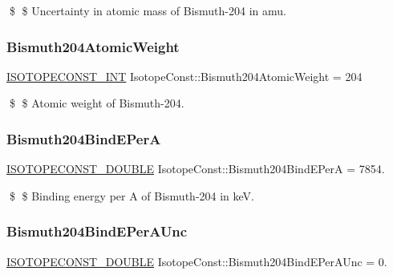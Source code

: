 \$ \$ Uncertainty in atomic mass of Bismuth-\/204 in amu. \mbox{\label{group___isotope_const-_bismuth-_bi204_ga3bc8106ca857e6fe36602bb5661df2bf}} 
\subsubsection{\texorpdfstring{Bismuth204\+Atomic\+Weight}{Bismuth204AtomicWeight}}
{\footnotesize\ttfamily \mbox{\hyperlink{group___isotope_const-_macros_ga5f18360b3e99483a35c32d789e62621c}{I\+S\+O\+T\+O\+P\+E\+C\+O\+N\+S\+T\+\_\+\+I\+NT}} Isotope\+Const\+::\+Bismuth204\+Atomic\+Weight = 204}

\$ \$ Atomic weight of Bismuth-\/204. \mbox{\label{group___isotope_const-_bismuth-_bi204_ga3e73ecb02b6dbdba60faa6b0eb3248a8}} 
\subsubsection{\texorpdfstring{Bismuth204\+Bind\+E\+PerA}{Bismuth204BindEPerA}}
{\footnotesize\ttfamily \mbox{\hyperlink{group___isotope_const-_macros_ga8f45a7272ce02c0b4c65c44636ed719a}{I\+S\+O\+T\+O\+P\+E\+C\+O\+N\+S\+T\+\_\+\+D\+O\+U\+B\+LE}} Isotope\+Const\+::\+Bismuth204\+Bind\+E\+PerA = 7854.}

\$ \$ Binding energy per A of Bismuth-\/204 in keV. \mbox{\label{group___isotope_const-_bismuth-_bi204_ga74cc5af432a32cc2e8946a120cce8054}} 
\subsubsection{\texorpdfstring{Bismuth204\+Bind\+E\+Per\+A\+Unc}{Bismuth204BindEPerAUnc}}
{\footnotesize\ttfamily \mbox{\hyperlink{group___isotope_const-_macros_ga8f45a7272ce02c0b4c65c44636ed719a}{I\+S\+O\+T\+O\+P\+E\+C\+O\+N\+S\+T\+\_\+\+D\+O\+U\+B\+LE}} Isotope\+Const\+::\+Bismuth204\+Bind\+E\+Per\+A\+Unc = 0.}

